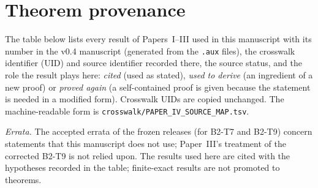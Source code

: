 \section{Theorem provenance}\label{app:prov}
The table below lists every result of Papers~I--III used in this manuscript with its number in the v0.4 manuscript (generated from the \texttt{.aux} files), the crosswalk identifier (UID) and source identifier recorded there, the source status, and the role the result plays here: \emph{cited} (used as stated), \emph{used to derive} (an ingredient of a new proof) or \emph{proved again} (a self-contained proof is given because the statement is needed in a modified form). Crosswalk UIDs are copied unchanged. The machine-readable form is \texttt{crosswalk/PAPER\_IV\_SOURCE\_MAP.tsv}.

\emph{Errata.} The accepted errata of the frozen releases (for B2-T7 and B2-T9) concern statements that this manuscript does not use; Paper~III's treatment of the corrected B2-T9 is not relied upon. The results used here are cited with the hypotheses recorded in the table; finite-exact results are not promoted to theorems.
\begin{center}\end{center}
